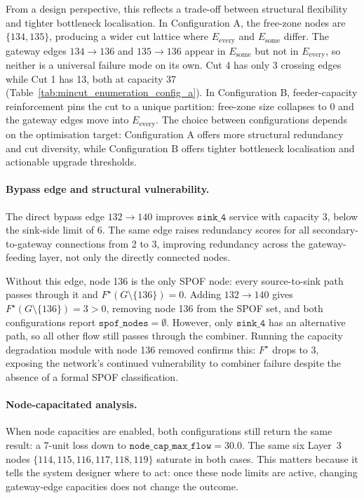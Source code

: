 \documentclass[12pt]{report}
\begin{document}
From a design perspective, this reflects a trade-off between structural flexibility and tighter bottleneck localisation. In Configuration A, the free-zone nodes are $\{134,135\}$, producing a wider cut lattice where $E_{\text{every}}$ and $E_{\text{some}}$ differ. The gateway edges $134 \to 136$ and $135 \to 136$ appear in $E_{\text{some}}$ but not in $E_{\text{every}}$, so neither is a universal failure mode on its own. Cut 4 has only 3 crossing edges while Cut 1 has 13, both at capacity 37 (Table~\ref{tab:mincut_enumeration_config_a}). In Configuration B, feeder-capacity reinforcement pins the cut to a unique partition: free-zone size collapses to 0 and the gateway edges move into $E_{\text{every}}$. The choice between configurations depends on the optimisation target: Configuration A offers more structural redundancy and cut diversity, while Configuration B offers tighter bottleneck localisation and actionable upgrade thresholds.

\paragraph{Bypass edge and structural vulnerability.}

The direct bypass edge $132 \to 140$ improves $\texttt{sink\_4}$ service with capacity 3, below the sink-side limit of 6. The same edge raises redundancy scores for all secondary-to-gateway connections from 2 to 3, improving redundancy across the gateway-feeding layer, not only the directly connected nodes.

Without this edge, node 136 is the only SPOF node: every source-to-sink path passes through it and $F^\star(G \setminus \{136\}) = 0$. Adding $132 \to 140$ gives $F^\star(G \setminus \{136\}) = 3 > 0$, removing node 136 from the SPOF set, and both configurations report $\texttt{spof\_nodes} = \emptyset$. However, only $\texttt{sink\_4}$ has an alternative path, so all other flow still passes through the combiner. Running the capacity degradation module with node 136 removed confirms this: $F^\star$ drops to 3, exposing the network's continued vulnerability to combiner failure despite the absence of a formal SPOF classification.

\paragraph{Node-capacitated analysis.}
When node capacities are enabled, both configurations still return the same result: a 7-unit loss down to $\texttt{node\_cap\_max\_flow}=30.0$. The same six Layer~3 nodes $\{114,115,116,117,118,119\}$ saturate in both cases. This matters because it tells the system designer where to act: once these node limits are active, changing gateway-edge capacities does not change the outcome.
\end{document}
